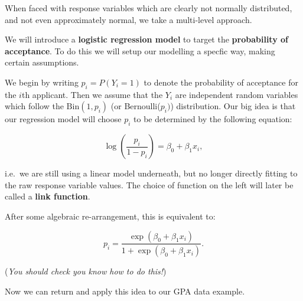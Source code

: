 \documentclass[
  a4paper,
  DIV=11,
  numbers=noendperiod]{scrreprt}
\newcommand{\term}[1]{\textbf{#1}}
\newenvironment{fbxSimple}[3]{\begin{tcolorbox}[enhanced, breakable,%
attach boxed title to top*={xshift=1.4pt},
boxed title style={boxrule=0.0mm, fuzzy shadow={1pt}{-1pt}{0mm}{0.1mm}{gray}, arc=.3em, rounded corners=east, sharp corners=west}, colframe=#1-color2, colbacktitle=#1-color1, colback = white, coltitle=black,  titlerule=0mm, toprule=0pt, bottomrule=.7pt, leftrule=.3em, rightrule=.7pt, outer arc=.3em,  	left=.5em, right=.5em, bottomtitle=1mm, toptitle=1mm,title=\textbf{#2}\hspace{0.5em}{#3}]}
{\end{tcolorbox}}
\begin{document}
\label{mini-introduction-to-generalised-linear-models}
\begin{fbxSimple}{Key}{Key Idea: }{Mini introduction to generalised linear models}
\label{mini-introduction-to-generalised-linear-models}
When faced with response variables which are clearly not normally
distributed, and not even approximately normal, we take a multi-level
approach.

We will introduce a \term{logistic regression model} to target the
\term{probability of acceptance}. To do this we will setup our modelling
a specfic way, making certain assumptions.

We begin by writing \(p_i=P(Y_i=1)\) to denote the probability of
acceptance for the \(i\)th applicant. Then we assume that the \(Y_i\)
are independent random variables which follow the \(\text{Bin}(1,p_i)\)
(or Bernoulli(\(p_i)\)) distribution. Our big idea is that our
regression model will choose \(p_i\) to be determined by the following
equation:

\[
\log \left(\dfrac{p_i}{1-p_i} \right)=\beta_0+\beta_1 x_i,
\]

i.e.~we are still using a linear model underneath, but no longer
directly fitting to the raw response variable values. The choice of
function on the left will later be called a \term{link function}.

After some algebraic re-arrangement, this is equivalent to:

\[
p_i=\dfrac{\exp(\beta_0+\beta_1 x_i)}{1+\exp(\beta_0+\beta_1 x_i)}.
\]

(\emph{You should check you know how to do this!})

\end{fbxSimple}

Now we can return and apply this idea to our GPA data example.
\end{document}
